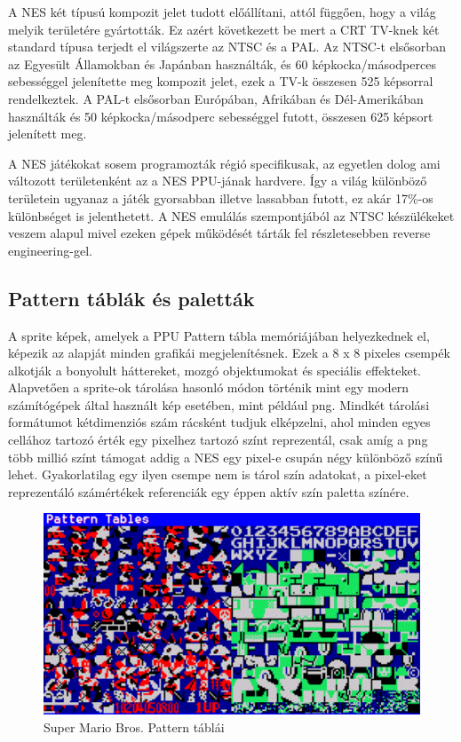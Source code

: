 	A NES két típusú kompozit jelet tudott előállítani, attól függően, hogy a világ melyik területére gyártották. Ez azért következett be mert a CRT TV-knek két standard típusa terjedt el világszerte az NTSC és a PAL. Az NTSC-t elsősorban az Egyesült Államokban és Japánban használták, és 60 képkocka/másodperces sebességgel jelenítette meg kompozit jelet, ezek a TV-k összesen 525 képsorral rendelkeztek. A PAL-t elsősorban Európában, Afrikában és Dél-Amerikában használták és 50 képkocka/másodperc sebességgel futott, összesen 625 képsort jelenített meg.
	
	A NES játékokat sosem programozták régió specifikusak, az egyetlen dolog ami változott területenként az a NES PPU-jának hardvere. Így a világ különböző területein ugyanaz a játék gyorsabban illetve lassabban futott, ez akár 17\%-os különbséget is jelenthetett. A NES emulálás szempontjából az NTSC készülékeket veszem alapul mivel ezeken gépek működését tárták fel részletesebben reverse engineering-gel.
	
	\subsection{Pattern táblák és paletták}
	A sprite képek, amelyek a PPU Pattern tábla memóriájában helyezkednek el, képezik az alapját minden grafikái megjelenítésnek. Ezek a  8 x 8 pixeles csempék alkotják a bonyolult háttereket, mozgó objektumokat és speciális effekteket. Alapvetően a sprite-ok tárolása hasonló módon történik mint egy modern számítógépek által használt kép esetében, mint például png. Mindkét tárolási formátumot kétdimenziós szám rácsként tudjuk elképzelni, ahol minden egyes cellához tartozó érték egy pixelhez tartozó színt reprezentál, csak amíg a png több millió színt támogat addig a NES egy pixel-e csupán négy különböző színű lehet. Gyakorlatilag egy ilyen csempe nem is tárol szín adatokat, a pixel-eket reprezentáló számértékek referenciák egy éppen aktív szín paletta színére.
	
	\begin{figure}[H]
		\centering
		\includegraphics[width=150mm, keepaspectratio]{figures/Mario-Patterns}
		\caption{Super Mario Bros. Pattern táblái}
		\label{fig:Mario-Pattern}
	\end{figure}
	
